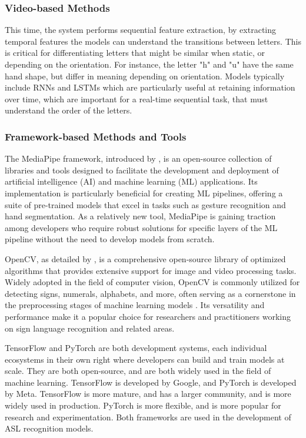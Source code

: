 \subsubsection{Video-based Methods} %
This time, the system performs sequential feature extraction, by extracting temporal features the models can understand the transitions between letters. This is critical for differentiating letters that might be similar when static, or depending on the orientation. For instance, the letter "h" and "u" have the same hand shape, but differ in meaning depending on orientation. Models typically include RNNs and LSTMs which are  particularly useful at retaining information over time, which are important for a real-time sequential task, that must understand the order of the letters.

\subsubsection{Framework-based Methods and Tools}
The MediaPipe framework, introduced by \cite{lugaresiMediaPipeFrameworkBuilding2019}, is an open-source collection of libraries and tools designed to facilitate the development and deployment of artificial intelligence (AI) and machine learning (ML) applications. Its implementation is particularly beneficial for creating ML pipelines, offering a suite of pre-trained models that excel in tasks such as gesture recognition and hand segmentation. As a relatively new tool, MediaPipe is gaining traction among developers who require robust solutions for specific layers of the ML pipeline without the need to develop models from scratch.

OpenCV, as detailed by \cite{culjakBriefIntroductionOpenCV}, is a comprehensive open-source library of optimized algorithms that provides extensive support for image and video processing tasks. Widely adopted in the field of computer vision, OpenCV is commonly utilized for detecting signs, numerals, alphabets, and more, often serving as a cornerstone in the preprocessing stages of machine learning models \cite{srinivasanPythonOpencvSign2023}. Its versatility and performance make it a popular choice for researchers and practitioners working on sign language recognition and related areas.

TensorFlow \cite{abadiTensorFlowSystemLargescale2016} and PyTorch \cite{paszkePyTorchImperativeStyle2019} are both development systems, each individual ecosystems in their own right where developers can build and train models at scale. They are both open-source, and are both widely used in the field of machine learning. TensorFlow is developed by Google, and PyTorch is developed by Meta. TensorFlow is more mature, and has a larger community, and is more widely used in production. PyTorch is more flexible, and is more popular for research and experimentation. Both frameworks are used in the development of ASL recognition models.

